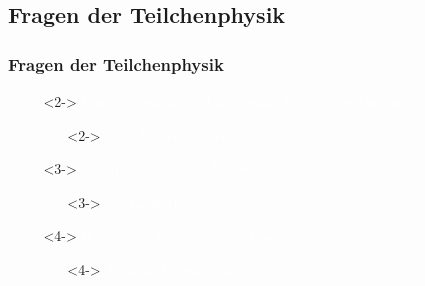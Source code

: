 \documentclass{beamer}
\begin{document}
{  \subsection{Fragen der Teilchenphysik}  
  \begin{frame}[t]
    \frametitle{Fragen der Teilchenphysik}
    \vskip0.5cm
    \begin{itemize}
    \item[~]<2-> \textcolor{white}{Woraus besteht das Universum? Woraus bestehen wir?}
      \begin{itemize}
      \item[~]<2-> \textcolor{white}{Grundbausteine der Materie}
      \end{itemize}
    \item[~]<3-> \textcolor{white}{Wie funktioniert das Universum?}
      \begin{itemize}
      \item[~]<3-> \textcolor{white}{Wechselwirkungen}
      \end{itemize}
    \item[~]<4-> \textcolor{white}{Wie ist das Universum entstanden?}
      \begin{itemize}
      \item[~]<4-> \textcolor{white}{Zeitliche Entwicklung}
      \end{itemize}
    \end{itemize}
\end{frame}}
\end{document}
